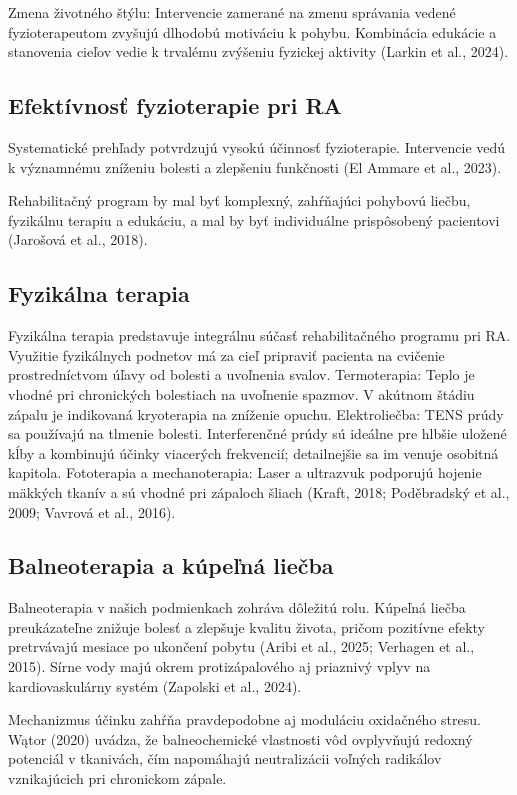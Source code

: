 Zmena životného štýlu: Intervencie zamerané na zmenu správania vedené fyzioterapeutom zvyšujú dlhodobú motiváciu k pohybu. Kombinácia edukácie a stanovenia cieľov vedie k trvalému zvýšeniu fyzickej aktivity (Larkin et al., 2024). 

\subsection{Efektívnosť fyzioterapie pri RA}

Systematické prehľady potvrdzujú vysokú účinnosť fyzioterapie. Intervencie vedú k významnému zníženiu bolesti a zlepšeniu funkčnosti (El Ammare et al., 2023). 

Rehabilitačný program by mal byť komplexný, zahŕňajúci pohybovú liečbu, fyzikálnu terapiu a edukáciu, a mal by byť individuálne prispôsobený pacientovi (Jarošová et al., 2018). 

\subsection{Fyzikálna terapia}

Fyzikálna terapia predstavuje integrálnu súčasť rehabilitačného programu pri RA. Využitie fyzikálnych podnetov má za cieľ pripraviť pacienta na cvičenie prostredníctvom úľavy od bolesti a uvoľnenia svalov. Termoterapia: Teplo je vhodné pri chronických bolestiach na uvoľnenie spazmov. V akútnom štádiu zápalu je indikovaná kryoterapia na zníženie opuchu. Elektroliečba: TENS prúdy sa používajú na tlmenie bolesti. Interferenčné prúdy sú ideálne pre hlbšie uložené kĺby a kombinujú účinky viacerých frekvencií; detailnejšie sa im venuje osobitná kapitola. Fototerapia a mechanoterapia: Laser a ultrazvuk podporujú hojenie mäkkých tkanív a sú vhodné pri zápaloch šliach (Kraft, 2018; Poděbradský et al., 2009; Vavrová et al., 2016). 

\subsection{Balneoterapia a kúpeľná liečba}

Balneoterapia v našich podmienkach zohráva dôležitú rolu. Kúpeľná liečba preukázateľne znižuje bolesť a zlepšuje kvalitu života, pričom pozitívne efekty pretrvávajú mesiace po ukončení pobytu (Aribi et al., 2025; Verhagen et al., 2015). Sírne vody majú okrem protizápalového aj priaznivý vplyv na kardiovaskulárny systém (Zapolski et al., 2024). 

Mechanizmus účinku zahŕňa pravdepodobne aj moduláciu oxidačného stresu. Wątor (2020) uvádza, že balneochemické vlastnosti vôd ovplyvňujú redoxný potenciál v tkanivách, čím napomáhajú neutralizácii voľných radikálov vznikajúcich pri chronickom zápale. 

